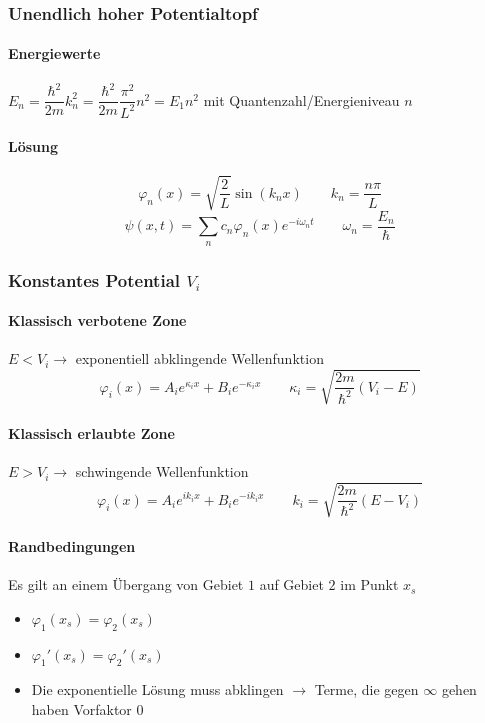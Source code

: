 \begin{sectionbox}
    \subsubsection{Unendlich hoher Potentialtopf}
    \paragraph{Energiewerte} $E_n = \dfrac{\hbar^2}{2m}k_n^2=\dfrac{\hbar^2}{2m}\dfrac{\pi^2}{L^2}n^2=E_1n^2$ mit Quantenzahl/Energieniveau $n$
    \paragraph{Lösung}\begin{equation*}
        \varphi_n(x) = \sqrt{\frac{2}{L}}\sin(k_n x) \qquad k_n=\frac{n\pi}{L}
    \end{equation*}
    \begin{equation*}
        \psi(x, t)=\sum_{n} c_n\varphi_n(x)e^{-i\omega_n t} \qquad \omega_n = \frac{E_n}{\hbar}
    \end{equation*}
\end{sectionbox}

\begin{sectionbox}
    \subsubsection{Konstantes Potential $V_i$}

    \paragraph{Klassisch verbotene Zone} $E<V_i \rightarrow$ exponentiell abklingende Wellenfunktion
    \begin{equation*}
        \varphi_i(x) = A_ie^{\kappa_ix} + B_ie^{-\kappa_ix} \qquad \kappa_i = \sqrt{\frac{2m}{\hbar^2}(V_i-E)}
    \end{equation*}

    \paragraph{Klassisch erlaubte Zone} $E>V_i \rightarrow$ schwingende Wellenfunktion
    \begin{equation*}
        \varphi_i(x) = A_ie^{ik_ix} + B_ie^{-ik_ix} \qquad k_i = \sqrt{\frac{2m}{\hbar^2}(E-V_i)}
    \end{equation*}

    \paragraph{Randbedingungen} Es gilt an einem Übergang von Gebiet $1$ auf Gebiet $2$ im Punkt $x_s$
    \begin{itemize}
        \item $\varphi_1(x_s) = \varphi_2(x_s)$
        \item $\varphi_1'(x_s) = \varphi_2'(x_s)$
        \item Die exponentielle Lösung muss abklingen $\rightarrow$ Terme, die gegen $\infty$ gehen haben Vorfaktor $0$
    \end{itemize}
\end{sectionbox}